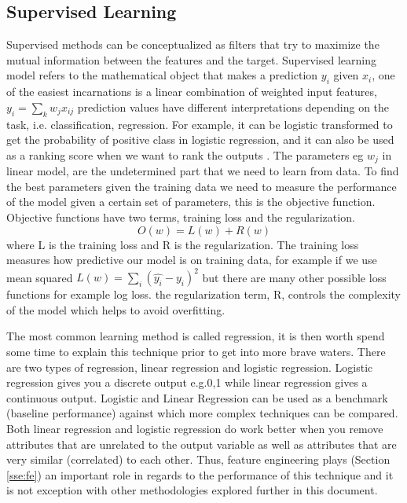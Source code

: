 \documentclass[11pt]{article}
\begin{document}
\subsection{Supervised Learning}
\label{sse:sup}
Supervised methods can be conceptualized as filters that try to maximize the mutual information between the features and the target.
Supervised learning model refers to the mathematical object that makes a prediction $y_i$ given $x_i$, one of the easiest incarnations is a linear combination of weighted input features, $y_i = \sum_k w_j x_{ij}$ prediction values have different interpretations depending on the task, i.e. classification, regression. For example, it can be logistic transformed to get the probability of positive class in logistic regression, and it can also be used as a ranking score when we want to rank the outputs \cite{patania2017topological}.
The parameters eg $w_j$ in linear model, are the undetermined part that we need to learn from data. To find the best parameters given the training data we need to measure the performance of the model given a certain set of parameters, this is the objective function. Objective functions have two terms, training loss and the regularization.
\begin{equation}
O(w) = L(w) + R(w)
\end{equation}
where L is the training loss and R is the regularization. The training loss measures how predictive our model is on training data, for example if we use mean squared $L(w) = \sum_i (\hat{y_i} - y_i)^2$ but there are many other possible loss functions for example log loss.
the regularization term, R, controls the complexity of the model which helps to avoid overfitting.

The most common learning method is called regression, it is then worth spend some time to explain this technique prior to get into more brave waters. 
There are two types of regression, linear regression and logistic regression. Logistic regression gives you a discrete output e.g.0,1 while linear regression gives a continuous output. Logistic and Linear Regression can be used as a benchmark (baseline performance) against which more complex techniques can be compared. 
Both linear regression and logistic regression do work better when you remove attributes that are unrelated to the output variable as well as attributes that are very similar (correlated) to each other. Thus, feature engineering plays (Section \ref{sse:fe}) an important role in regards to the performance of this technique and it is not exception with other methodologies explored further in this document.
\end{document}
